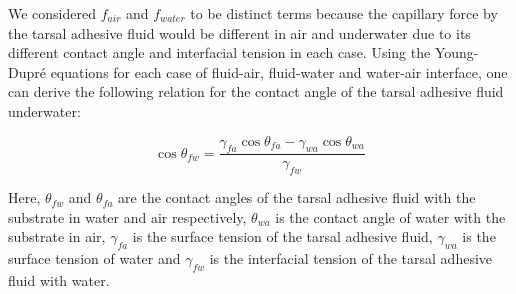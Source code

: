 \documentclass[vruler,JEB]{COB}%
\begin{document}
We considered $f_{air}$ and $f_{water}$ to be distinct terms
because the capillary force by the tarsal adhesive fluid would be different
in air and underwater due to its different contact angle and interfacial
tension in each case. Using the Young-Dupr\'{e} equations
for each case of fluid-air, fluid-water and water-air interface, one
can derive the following relation for the contact angle of the tarsal adhesive
fluid underwater:

\begin{equation}
\cos\theta_{fw}=\frac{\gamma_{fa}\cos\theta_{fa}-\gamma_{wa}\cos\theta_{wa}}{\gamma_{fw}}\label{eq:theta_fw}
\end{equation}

Here, $\theta_{fw}$ and $\theta_{fa}$ are the contact angles of
the tarsal adhesive fluid with the substrate in water and air respectively,
$\theta_{wa}$ is the contact angle of water with the substrate in
air, $\gamma_{fa}$ is the surface tension of the tarsal adhesive fluid,
$\gamma_{wa}$ is the surface tension of water and $\gamma_{fw}$
is the interfacial tension of the tarsal adhesive fluid with water.
\end{document}
